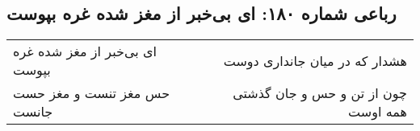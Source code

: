 \begin{center}
\section*{رباعی شماره ۱۸۰: ای بی‌خبر از مغز شده غره بپوست}
\label{sec:0180}
\begin{longtable}{l p{0.5cm} r}
ای بی‌خبر از مغز شده غره بپوست
&&
هشدار که در میان جانداری دوست
\\
حس مغز تنست و مغز حست جانست
&&
چون از تن و حس و جان گذشتی همه اوست
\\
\end{longtable}
\end{center}
